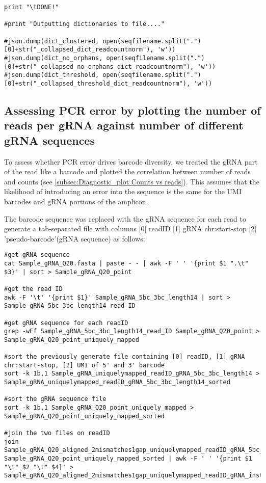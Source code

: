 \begin{footnotesize}
\begin{lstlisting}
print "\tDONE!"

#print "Outputting dictionaries to file...."

#json.dump(dict_clustered, open(seqfilename.split(".")[0]+str("_collapsed_dict_readcountnorm"), 'w'))
#json.dump(dict_no_orphans, open(seqfilename.split(".")[0]+str("_collapsed_no_orphans_dict_readcountnorm"), 'w'))
#json.dump(dict_threshold, open(seqfilename.split(".")[0]+str("_collapsed_threshold_dict_readcountnorm"), 'w'))

\end{lstlisting}

\subsection{Assessing PCR error by plotting the number of reads per gRNA against number of different gRNA sequences}

To assess whether PCR error drives barcode diversity, we treated the gRNA part of the read like a barcode and plotted the correlation between number of reads and counts (see \ref{subsec:Diagnostic_plot Counts vs reads}). This assumes that the likelihood of introducing an error into the sequence is the same for the UMI barcodes and gRNA portions of the amplicon.

The barcode sequence was replaced with the gRNA sequence for each read to generate a tab-separated file with columns [0] readID [1] gRNA chr:start-stop [2] 'pseudo-barcode'(gRNA sequence) as follows:

\begin{lstlisting}
#get gRNA sequence 
cat Sample_gRNA_Q20.fasta | paste - - | awk -F ' ' '{print $1 ".\t" $3}' | sort > Sample_gRNA_Q20_point

#get the read ID
awk -F '\t' '{print $1}' Sample_gRNA_5bc_3bc_length14 | sort > Sample_gRNA_5bc_3bc_length14_read_ID

#get gRNA sequence for each readID
grep -wFf Sample_gRNA_5bc_3bc_length14_read_ID Sample_gRNA_Q20_point > Sample_gRNA_Q20_point_uniquely_mapped

#sort the previously generate file containing [0] readID, [1] gRNA chr:start-stop, [2] UMI of 5' and 3' barcode
sort -k 1b,1 Sample_gRNA_uniquelymapped_readID_gRNA_5bc_3bc_length14 > Sample_gRNA_uniquelymapped_readID_gRNA_5bc_3bc_length14_sorted

#sort the gRNA sequence file
sort -k 1b,1 Sample_gRNA_Q20_point_uniquely_mapped > Sample_gRNA_Q20_point_uniquely_mapped_sorted

#join the two files on readID
join Sample_gRNA_Q20_aligned_2mismatches1gap_uniquelymapped_readID_gRNA_5bc_3bc_length14_sorted Sample_gRNA_Q20_point_uniquely_mapped_sorted | awk -F ' ' '{print $1 "\t" $2 "\t" $4}' > Sample_gRNA_Q20_aligned_2mismatches1gap_uniquelymapped_readID_gRNA_instead_of_barcode
\end{lstlisting}



\end{footnotesize}
